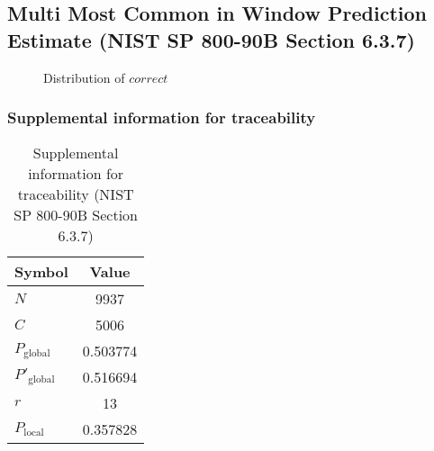 \documentclass[a3paper,xelatex,english]{bxjsarticle}
\begin{document}
\subsection{Multi Most Common in Window Prediction Estimate (NIST SP 800-90B Section 6.3.7)}
\begin{figure}[htbp]
\centering

\caption{Distribution of $correct$}
\end{figure}
\subsubsection{Supplemental information for traceability}
\renewcommand{\arraystretch}{1.8}
\begin{table}[h]
\caption{Supplemental information for traceability (NIST SP 800-90B Section 6.3.7)}
\begin{center}
\begin{tabular}{|l|c|}
\hline 
\rowcolor{anotherlightblue} %
Symbol				& Value \\ \hline 
$N$				& 9937\\ \hline 
$C$				& 5006\\ \hline 
$P_{\textrm{global}}$				& 0.503774\\ \hline 
$P'_{\textrm{global}}$			& 0.516694\\ \hline 
$r$				& 13\\ \hline 
$P_{\textrm{local}}$ 			& 0.357828\\ \hline
\end{tabular}
\end{center}
\end{table}
\renewcommand{\arraystretch}{1.4}
\clearpage
\end{document}
